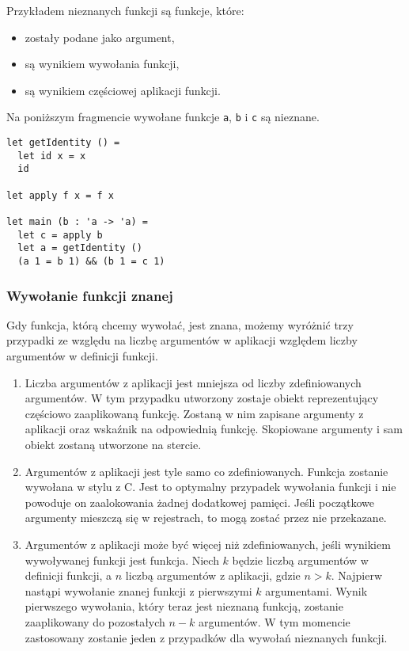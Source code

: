 \documentclass[declaration,shortabstract]{iithesis}
\begin{document}
Przykładem nieznanych funkcji są funkcje, które: 
\begin{itemize}
  \item zostały podane jako argument,
  \item są wynikiem wywołania funkcji,
  \item są wynikiem częściowej aplikacji funkcji.
\end{itemize}

Na poniższym fragmencie wywołane funkcje \texttt{a}, \texttt{b} i \texttt{c} 
są nieznane.

\begin{lstlisting}[frame=lines]
let getIdentity () = 
  let id x = x 
  id

let apply f x = f x

let main (b : 'a -> 'a) = 
  let c = apply b 
  let a = getIdentity ()
  (a 1 = b 1) && (b 1 = c 1)
\end{lstlisting}

\subsubsection{Wywołanie funkcji znanej}

Gdy funkcja, którą chcemy wywołać, jest znana, możemy wyróżnić trzy przypadki 
ze względu na liczbę argumentów w aplikacji względem liczby argumentów
w definicji funkcji.

\begin{enumerate}
  \item Liczba argumentów z aplikacji jest mniejsza od liczby zdefiniowanych 
  argumentów. W tym przypadku utworzony zostaje obiekt reprezentujący częściowo
  zaaplikowaną funkcję. Zostaną w nim zapisane argumenty z aplikacji
  oraz 
  wskaźnik na odpowiednią funkcję. Skopiowane argumenty i sam obiekt 
  zostaną 
  utworzone na stercie.
  \item Argumentów z aplikacji jest tyle samo co zdefiniowanych. 
  Funkcja zostanie wywołana w stylu z C. Jest to optymalny 
  przypadek wywołania funkcji i nie powoduje on zaalokowania żadnej 
  dodatkowej pamięci. 
  Jeśli początkowe argumenty mieszczą się w rejestrach, to mogą zostać 
  przez nie przekazane.
  \item Argumentów z aplikacji może być więcej niż zdefiniowanych, 
  jeśli wynikiem wywoływanej funkcji jest funkcja. Niech $k$ będzie 
  liczbą argumentów w definicji funkcji, a $n$ liczbą 
  argumentów z aplikacji, gdzie $n > k$. Najpierw nastąpi wywołanie znanej 
  funkcji z pierwszymi $k$ argumentami. Wynik pierwszego wywołania, 
  który teraz jest nieznaną funkcją, zostanie zaaplikowany do pozostałych
  $n - k$ argumentów. W tym momencie 
  zastosowany zostanie jeden z przypadków dla wywołań nieznanych funkcji.

\end{enumerate}
\end{document}
